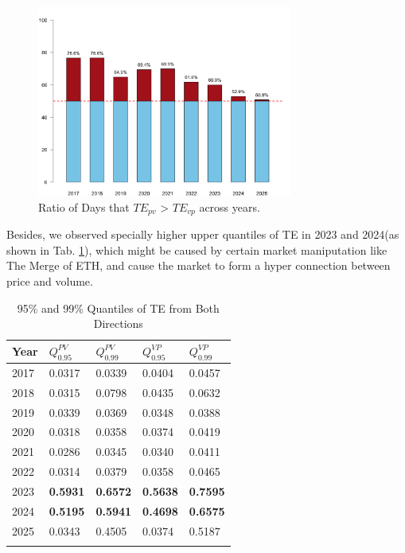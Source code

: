 \documentclass{elsarticle}
\def\rightarrow{}%
\begin{document}
\begin{figure}[H]
  \centering
  \includegraphics[width=0.75\textwidth]{imgs/greaterRatio.png}
  \caption{Ratio of Days that $TE_{p \rightarrow v}$ > $TE_{v \rightarrow p}$ across years.}
  \label{fig:TE_CP_daily}
  \end{figure}
Besides, we observed specially higher upper quantiles of TE in 2023 and 2024(as shown in Tab. \ref{tab:te_quantiles}), which might be caused by certain market maniputation like The Merge of ETH, and cause the market to form a hyper connection between price and volume.
\begin{table}[H]
  \caption{95\% and 99\% Quantiles of TE from Both Directions}
  \label{tab:te_quantiles}
  \centering
  \begin{tabular}{lllll}
    \hline\noalign{\smallskip}
    \textbf{Year} & $Q_{0.95}^{P \rightarrow V}$ & $Q_{0.99}^{P \rightarrow V}$ & $Q_{0.95}^{V \rightarrow P}$ & $Q_{0.99}^{V \rightarrow P}$ \\
    \hline\noalign{\smallskip}
    2017 & 0.0317 & 0.0339 & 0.0404 & 0.0457 \\
    2018 & 0.0315 & 0.0798 & 0.0435 & 0.0632 \\
    2019 & 0.0339 & 0.0369 & 0.0348 & 0.0388 \\
    2020 & 0.0318 & 0.0358 & 0.0374 & 0.0419 \\
    2021 & 0.0286 & 0.0345 & 0.0340 & 0.0411 \\
    2022 & 0.0314 & 0.0379 & 0.0358 & 0.0465 \\
    2023 & \textbf{0.5931} & \textbf{0.6572} & \textbf{0.5638} & \textbf{0.7595} \\
    2024 & \textbf{0.5195} & \textbf{0.5941} & \textbf{0.4698} & \textbf{0.6575} \\
    2025 & 0.0343 & 0.4505 & 0.0374 & 0.5187 \\
    \hline\noalign{\smallskip}
  \end{tabular}
\end{table}
\end{document}
